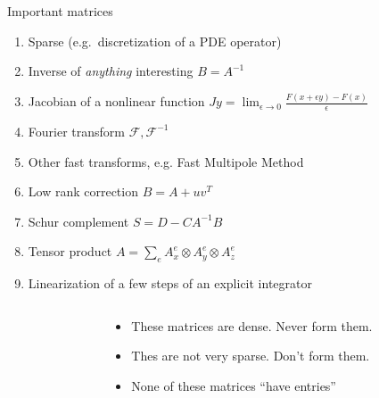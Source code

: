 \begin{frame}{Important matrices}
  \begin{enumerate}
  \item Sparse (e.g.~discretization of a PDE operator)
  \item \alert<2,4>{Inverse of \emph{anything} interesting $B = A^{-1}$}
  \item \alert<4>{Jacobian of a nonlinear function $J y = \lim_{\epsilon \to 0} \frac{F(x + \epsilon y) - F(x)}{\epsilon}$}
  \item \alert<2,4>{Fourier transform $\mathcal{F},\mathcal{F}^{-1}$}
  \item \alert<2,4>{Other fast transforms, e.g. Fast Multipole Method}
  \item \alert<2,4>{Low rank correction $B = A + u v^T$}
  \item \alert<2,4>{Schur complement $S = D - C A^{-1} B$}
  \item \alert<3,4>{Tensor product $A = \sum_e A_x^e \otimes A_y^e \otimes A_z^e$}
  \item \alert<3,4>{Linearization of a few steps of an explicit integrator}
  \end{enumerate}
  \begin{columns}\begin{column}{0.3\textwidth}\end{column}\begin{column}{0.7\textwidth}
  \begin{itemize}
  \item<only@2> These matrices are \alert<2>{dense}.  Never form them.
  \item<only@3>{Thes are \alert<3>{not very sparse}.}
    Don't form them.
  \item<only@4> {None of these matrices ``have entries''}
  \end{itemize}
\end{column}
\end{columns}
\end{frame}
